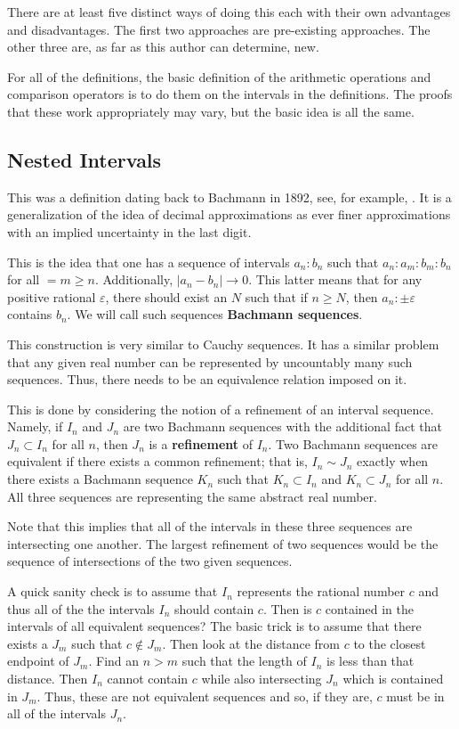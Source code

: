 \documentclass[12pt]{article}
\begin{document}
There are at least five distinct ways of doing this each with their own advantages and disadvantages. The first two approaches are pre-existing approaches. The other three are, as far as this author can determine, new. 

For all of the definitions, the basic definition of the arithmetic operations and comparison operators is to do them on the intervals in the definitions. The proofs that these work appropriately may vary, but the basic idea is all the same. 

\subsection{Nested Intervals}

This was a definition dating back to Bachmann in 1892, see, for example, \cite{ittay-2015}. It is a generalization of the idea of decimal approximations as ever finer approximations with an implied uncertainty in the last digit. 

This is the idea that one has a sequence of intervals $a_n:b_n$ such that $a_n:a_m:b_m:b_n$ for all $=m \geq n$. Additionally, $|a_n - b_n| \to 0$. This latter means that for any positive rational $\varepsilon$, there should exist an $N$ such that if $n \geq N$, then $a_n:\pm \varepsilon$ contains $b_n$. We will call such sequences \textbf{Bachmann sequences}. 

This construction is very similar to Cauchy sequences. It has a similar problem that any given real number can be represented by uncountably many such sequences. Thus, there needs to be an equivalence relation imposed on it.

This is done by considering the notion of a refinement of an interval sequence. Namely, if $I_n$ and $J_n$ are two Bachmann sequences with the additional fact that $J_n \subset I_n$ for all $n$, then $J_n$ is a \textbf{refinement} of $I_n$. Two Bachmann sequences are equivalent if there exists a common refinement; that is, $I_n \sim J_n$ exactly when there exists a Bachmann sequence $K_n$ such that $K_n \subset I_n$ and $K_n \subset J_n$ for all $n$. All three sequences are representing the same abstract real number. 

Note that this implies that all of the intervals in these three sequences are intersecting one another. The largest refinement of two sequences would be the sequence of intersections of the two given sequences. 

A quick sanity check is to assume that $I_n$ represents the rational number $c$ and thus all of the  the intervals $I_n$ should contain $c$. Then is $c$ contained in the intervals of all equivalent sequences? The basic trick is to assume that there exists a $J_m$ such that $c \notin J_m$. Then look at the distance from $c$ to the closest endpoint of $J_m$. Find an $n > m$ such that the length of $I_n$ is less than that distance. Then $I_n$ cannot contain $c$ while also intersecting $J_n$ which is contained in $J_m$. Thus, these are not equivalent sequences and so, if they are, $c$ must be in all of the intervals $J_n$. 
\end{document}

